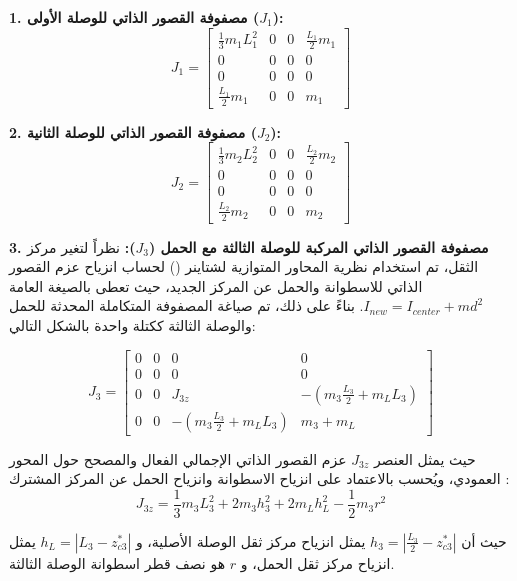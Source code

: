 \textbf{1. مصفوفة القصور الذاتي للوصلة الأولى ($J_1$):}
\begin{equation}
J_1 = \begin{bmatrix}
\frac{1}{3}m_1 L_1^2 & 0 & 0 & \frac{L_1}{2}m_1 \\
0 & 0 & 0 & 0 \\
0 & 0 & 0 & 0 \\
\frac{L_1}{2}m_1 & 0 & 0 & m_1
\end{bmatrix}
\end{equation}

\textbf{2. مصفوفة القصور الذاتي للوصلة الثانية ($J_2$):}
\begin{equation}
J_2 = \begin{bmatrix}
\frac{1}{3}m_2 L_2^2 & 0 & 0 & \frac{L_2}{2}m_2 \\
0 & 0 & 0 & 0 \\
0 & 0 & 0 & 0 \\
\frac{L_2}{2}m_2 & 0 & 0 & m_2
\end{bmatrix}
\end{equation}

\textbf{3. مصفوفة القصور الذاتي المركبة للوصلة الثالثة مع الحمل ($J_3$):}
نظراً لتغير مركز الثقل، تم استخدام نظرية المحاور المتوازية لشتاينر () لحساب انزياح عزم القصور الذاتي للاسطوانة والحمل عن المركز الجديد، حيث تعطى بالصيغة العامة $I_{new} = I_{center} + md^2$. بناءً على ذلك، تم صياغة المصفوفة المتكاملة المحدثة للحمل والوصلة الثالثة ككتلة واحدة بالشكل التالي:

\begin{equation}
J_3 = \begin{bmatrix}
0 & 0 & 0 & 0 \\
0 & 0 & 0 & 0 \\
0 & 0 & J_{3z} & -\left(m_3 \frac{L_3}{2} + m_L L_3\right) \\
0 & 0 & -\left(m_3 \frac{L_3}{2} + m_L L_3\right) & m_3 + m_L
\end{bmatrix}
\end{equation}

حيث يمثل العنصر $J_{3z}$ عزم القصور الذاتي الإجمالي الفعال والمصحح حول المحور العمودي، ويُحسب بالاعتماد على انزياح الاسطوانة وانزياح الحمل عن المركز المشترك :
\begin{equation}
J_{3z} = \frac{1}{3}m_3 L_3^2 + 2m_3 h_3^2 + 2m_L h_L^2 - \frac{1}{2}m_3 r^2
\end{equation}

حيث أن $h_3 = \left| \frac{L_3}{2} - z_{c3}^* \right|$ يمثل انزياح مركز ثقل الوصلة الأصلية، و $h_L = \left| L_3 - z_{c3}^* \right|$ يمثل انزياح مركز ثقل الحمل، و $r$ هو نصف قطر اسطوانة الوصلة الثالثة.